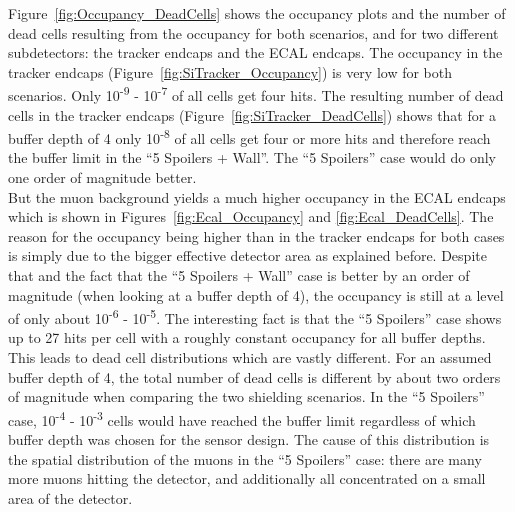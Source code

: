 Figure~\ref{fig:Occupancy_DeadCells} shows the occupancy plots and the number of dead cells resulting from the occupancy for both scenarios, and for two different subdetectors: the tracker endcaps and the ECAL endcaps.
The occupancy in the tracker endcaps (Figure~\ref{fig:SiTracker_Occupancy}) is very low for both scenarios.
Only 10\textsuperscript{-9} - 10\textsuperscript{-7} of all cells get four hits.
The resulting number of dead cells in the tracker endcaps (Figure~\ref{fig:SiTracker_DeadCells}) shows that for a buffer depth of 4 only 10\textsuperscript{-8} of all cells get four or more hits and therefore reach the buffer limit in the ``5 Spoilers + Wall''.
The ``5 Spoilers'' case would do only one order of magnitude better.\\
But the muon background yields a much higher occupancy in the ECAL endcaps which is shown in Figures~\ref{fig:Ecal_Occupancy} and \ref{fig:Ecal_DeadCells}.
The reason for the occupancy being higher than in the tracker endcaps for both cases is simply due to the bigger effective detector area as explained before.
Despite that and the fact that the ``5 Spoilers + Wall'' case is better by an order of magnitude (when looking at a buffer depth of 4), the occupancy is still at a level of only about 10\textsuperscript{-6} - 10\textsuperscript{-5}.
The interesting fact is that the ``5 Spoilers'' case shows up to 27 hits per cell with a roughly constant occupancy for all buffer depths.
This leads to dead cell distributions which are vastly different.
For an assumed buffer depth of 4, the total number of dead cells is different by about two orders of magnitude when comparing the two shielding scenarios.
In the ``5 Spoilers'' case, 10\textsuperscript{-4} - 10\textsuperscript{-3} cells would have reached the buffer limit regardless of which buffer depth was chosen for the sensor design.
The cause of this distribution is the spatial distribution of the muons in the ``5 Spoilers'' case: there are many more muons hitting the detector, and additionally all concentrated on a small area of the detector.

